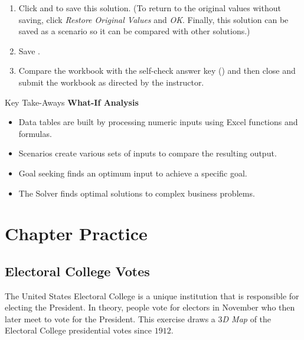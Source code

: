 \begin{enumerate}[resume]
	\item Click  and  to save this solution. (To return to the original values without saving, click \textit{Restore Original Values} and \textit{OK}. Finally, this solution can be saved as a scenario so it can be compared with other solutions.)
	\item Save .
	\item Compare the workbook with the self-check answer key () and then close and submit the  workbook as directed by the instructor.

\end{enumerate}

\begin{center}
	\begin{tkwbox}{Key Take-Aways}
		\textbf{What-If Analysis}
		\\
		\begin{itemize}
			\setlength{\itemsep}{0pt}
			\setlength{\parskip}{0pt}
			\setlength{\parsep}{0pt}
			
			\item Data tables are built by processing numeric inputs using Excel functions and formulas.
			\item Scenarios create various sets of inputs to compare the resulting output.
			\item Goal seeking finds an optimum input to achieve a specific goal.
			\item The Solver finds optimal solutions to complex business problems.
			
		\end{itemize}
	\end{tkwbox}
\end{center}

\section{Chapter Practice}

\subsection{Electoral College Votes}

The United States Electoral College is a unique institution that is responsible for electing the President. In theory, people vote for electors in November who then later meet to vote for the President. This exercise draws a \textit{$ 3 $D Map} of the Electoral College presidential votes since $ 1912 $.

